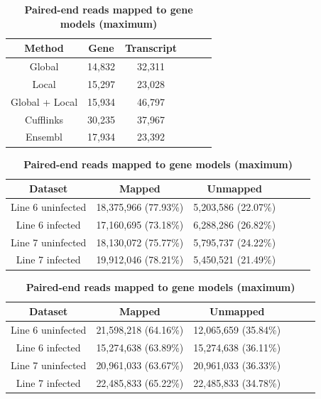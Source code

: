 \documentclass[10pt]{article}
\begin{document}
\begin{table}[!ht]
\caption{
\bf{Number of putative genes and isoforms}}
\begin{tabular}{cccccc}
\hline
Method& Gene & Transcript \\ 
\hline
Global & 14,832 & 32,311 \\
Local & 15,297 & 23,028 \\
Global + Local & 15,934 & 46,797 \\
Cufflinks & 30,235 & 37,967 \\
Ensembl & 17,934 & 23,392 \\
\hline
\end{tabular}
\label{genes_transcripts}

\caption{
\bf{Single-end reads mapped to gene models (maximum)}}
\begin{tabular}{cccccc}
\hline
Dataset & Mapped & Unmapped \\
\hline
Line 6 uninfected & 18,375,966 (77.93\%) & 5,203,586 (22.07\%) \\
Line 6 infected & 17,160,695 (73.18\%) & 6,288,286 (26.82\%) \\
Line 7 uninfected & 18,130,072 (75.77\%) & 5,795,737 (24.22\%) \\
Line 7 infected & 19,912,046 (78.21\%) & 5,450,521 (21.49\%) \\
\hline
\end{tabular}
\label{single-end_map}

\caption{
\bf{Paired-end reads mapped to gene models (maximum)}}
\begin{tabular}{cccccc}
\hline
Dataset & Mapped & Unmapped \\
\hline
Line 6 uninfected & 21,598,218 (64.16\%) & 12,065,659 (35.84\%) \\
Line 6 infected & 15,274,638 (63.89\%) & 15,274,638 (36.11\%) \\
Line 7 uninfected & 20,961,033 (63.67\%) & 20,961,033 (36.33\%) \\
Line 7 infected & 22,485,833 (65.22\%) & 22,485,833 (34.78\%) \\
\hline
\end{tabular}
\label{paired-end_map}
\end{table}
\end{document}
